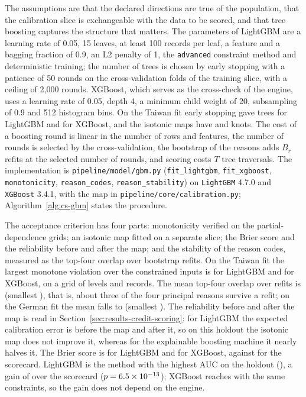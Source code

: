 The assumptions are that the declared directions are true of the population, that the calibration slice is exchangeable with the
data to be scored, and that tree boosting captures the structure that matters. The parameters of LightGBM are a learning rate of
0.05, 15 leaves, at least 100 records per leaf, a feature and a bagging fraction of 0.9, an L2 penalty of 1, the \texttt{advanced}
constraint method and deterministic training; the number of trees is chosen by early stopping with a patience of 50 rounds on
the cross-validation folds of the training slice, with a ceiling of 2,000 rounds. XGBoost, which serves as the cross-check of the
engine, uses a learning rate of 0.05, depth 4, a minimum child weight of 20, subsampling of 0.9 and 512 histogram bins. On the
Taiwan fit early stopping gave \csFitTwLgRounds{} trees for LightGBM and \csFitTwXgRounds{} for XGBoost, and the isotonic maps have
\csFitTwLgKnots{} and \csFitTwXgKnots{} knots. The cost of a boosting round is linear in the number of rows and features, the
number of rounds is selected by the cross-validation, the bootstrap of the reasons adds $B_r$ refits at the selected number of
rounds, and scoring costs $T$ tree traversals. The implementation is \texttt{pipeline/model/gbm.py} (\texttt{fit\_lightgbm},
\texttt{fit\_xgboost}, \texttt{monotonicity}, \texttt{reason\_codes}, \texttt{reason\_stability}) on \texttt{LightGBM} 4.7.0 and
\texttt{XGBoost} 3.4.1, with the map in \texttt{pipeline/core/calibration.py}; Algorithm~\ref{alg:cs-gbm} states the procedure.

The acceptance criterion has four parts: monotonicity verified on the partial-dependence grids; an isotonic map fitted on a
separate slice; the Brier score and the reliability before and after the map; and the stability of the reason codes, measured as
the top-four overlap over bootstrap refits. On the Taiwan fit the largest monotone violation over the
\csFitTwLgConstrained{} constrained inputs is \csFitTwLgViol{} for LightGBM and \csFitTwXgViol{} for XGBoost, on a grid of
\csFitTwLgGrid{} levels and \csFitTwLgRows{} records. The mean top-four overlap over \csFitTwReasonBoot{} refits is \csFitTwReasonMean{} (smallest \csFitTwReasonMin{}),
that is, about three of the four principal reasons survive a refit; on the German fit the mean falls to \csFitGeReasonMean{}
(smallest \csFitGeReasonMin{}). The reliability before and after the map is read in
Section~\ref{sec:results-credit-scoring}: for LightGBM the expected calibration error is \csHoEceLgRaw{} before the map and
\csHoEceLgCal{} after it, so on this holdout the isotonic map does not improve it, whereas for the explainable boosting machine it
nearly halves it. The Brier score is \csHoLgBrier{} for LightGBM and \csHoXgBrier{} for XGBoost, against \csHoScBrier{} for the
scorecard. LightGBM is the method with the highest AUC on the holdout (\csHoLgAuc{}), a gain of \csHoLgDlDiff{} over the scorecard
($p=6.5\times10^{-13}{}$); XGBoost reaches \csHoXgAuc{} with the same constraints, so the gain does not depend on the engine.

